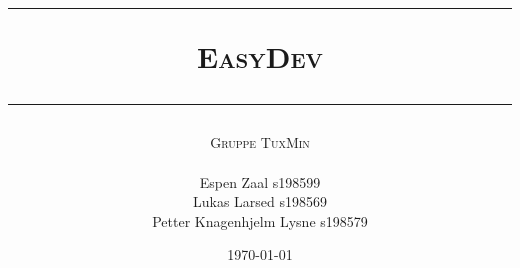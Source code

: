 \begin{titlepage}
 



\title{
\rule{\linewidth}{0.5mm}
\textsc{\LARGE EasyDev}
\rule{\linewidth}{0.5mm}
}





\author{\textsc{\Large Gruppe TuxMin}\\ \hline \\ Espen Zaal s198599\\Lukas
Larsed s198569\\Petter Knagenhjelm Lysne s198579}



\date{\today}



\end{titlepage}
